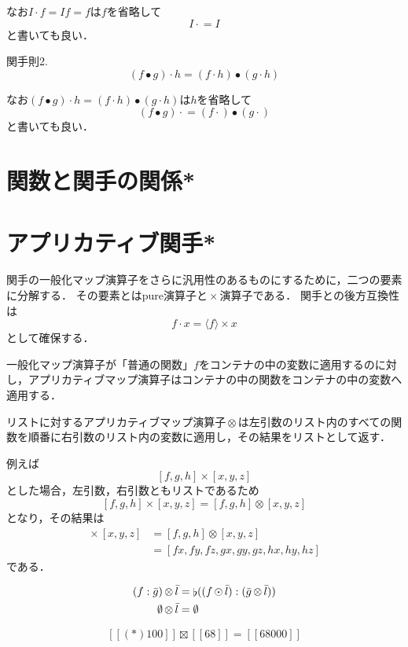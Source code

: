 \documentclass[twocolumn]{jsbook}
\def\[{[\![}
\def\]{]\!]}
\DeclareMathOperator{\hsklApplicativeMap}{\times}
\DeclareMathOperator{\hsklApplicativeListMap}{\otimes}
\DeclareMathOperator{\hsklApplicativeMaybeMap}{\boxtimes}
\DeclareMathOperator{\hsklConcat}{\flat}
\DeclareMathOperator{\hsklFmap}{\cdot}
\DeclareMathOperator{\hsklMap}{\odot}
\newcommand{\hsklEmptyList}{\emptyset}
\newcommand{\hsklJust}[1]{\[#1\]}
\newcommand{\hsklList}[1]{\Bar{#1}}
\newcommand{\hsklPure}[1]{\langle#1\rangle}
\DeclareMathOperator{\mathCompose}{\bullet}
\begin{document}
なお$I\hsklFmap f=If=f$は$f$を省略して
$$I\hsklFmap=I$$
と書いても良い．

関手則2.
$$(f\mathCompose g)\hsklFmap h=(f\hsklFmap h)\mathCompose(g\hsklFmap h)$$

なお$(f\mathCompose g)\hsklFmap h=(f\hsklFmap h)\mathCompose(g\hsklFmap h)$は$h$を省略して$$(f\mathCompose g)\hsklFmap=(f\hsklFmap)\mathCompose(g\hsklFmap)$$と書いても良い．



\section{関数と関手の関係*}


\section{アプリカティブ関手*}

関手の一般化マップ演算子をさらに汎用性のあるものにするために，二つの要素に分解する．
その要素とはpure演算子と$\hsklApplicativeMap$演算子である．
関手との後方互換性は$$f\hsklFmap x=\hsklPure{f}\hsklApplicativeMap x$$として確保する．


一般化マップ演算子が「普通の関数」$f$をコンテナの中の変数に適用するのに対し，アプリカティブマップ演算子はコンテナの中の関数をコンテナの中の変数へ適用する．

リストに対するアプリカティブマップ演算子$\hsklApplicativeListMap$は左引数のリスト内のすべての関数を順番に右引数のリスト内の変数に適用し，その結果をリストとして返す．

例えば$$[f,g,h]\hsklApplicativeMap[x,y,z]$$とした場合，左引数，右引数ともリストであるため$$[f,g,h]\hsklApplicativeMap[x,y,z]=[f,g,h]\hsklApplicativeListMap[x,y,z]$$となり，その結果は
\begin{align*}
[f,g,h]\hsklApplicativeMap[x,y,z]&=[f,g,h]\hsklApplicativeListMap[x,y,z]\\
&=[fx,fy,fz,gx,gy,gz,hx,hy,hz]
\end{align*}
である．


\begin{align*}
(f:\hsklList{g})\hsklApplicativeListMap\hsklList{l}&=\hsklConcat((f\hsklMap\hsklList{l}):(\hsklList{g}\hsklApplicativeListMap\hsklList{l}))\\
\hsklEmptyList\hsklApplicativeListMap\hsklList{l}&=\hsklEmptyList
\end{align*}

$$\hsklJust{(*)100}\hsklApplicativeMaybeMap{}\hsklJust{68}=\hsklJust{68000}$$
\end{document}
